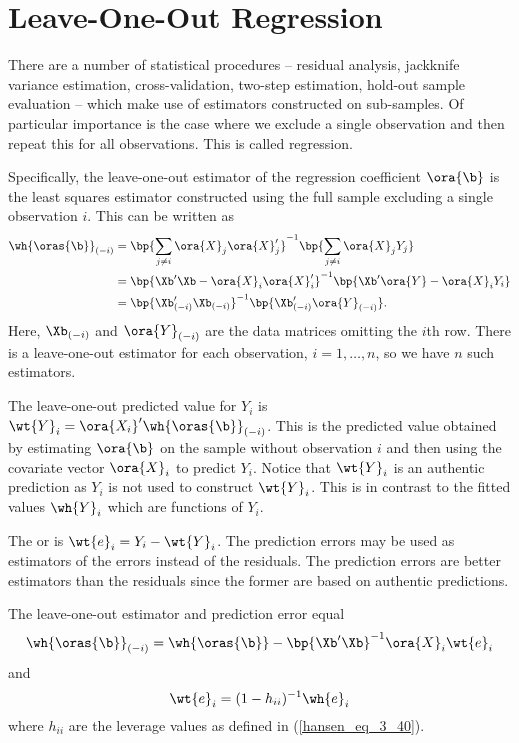 \section{Leave-One-Out Regression}
There are a number of statistical procedures -- residual analysis, jackknife variance estimation, cross-validation,
two-step estimation, hold-out sample evaluation -- which make use of estimators constructed on sub-samples. Of particular importance is the case where we exclude a single observation and then repeat this for all observations. This is called  regression.

Specifically, the leave-one-out estimator of the regression coefficient $\ora{\b}$ is the least squares estimator constructed using the full sample excluding a single observation $i$. This can be written as 
\begin{equation}
    \label{hansen_eq_3_42}
    \begin{aligned}
        \wh{\oras{\b}}_{(-i)} & = \bp{\sum_{j \neq i}\ora{X}_j \ora{X}_j^\prime}^{-1} \bp{\sum_{j \neq i}\ora{X}_j Y_j} \\
        & = \bp{\Xb^\prime \Xb- \ora{X}_i \ora{X}_i^\prime}^{-1} \bp{\Xb^\prime \ora{Y} - \ora{X}_i Y_i} \\
        & = \bp{\Xb^\prime_{(-i)} \Xb_{(-i)}}^{-1} \bp{\Xb^\prime_{(-i)} \ora{Y}_{(-i)}}.
    \end{aligned}
\end{equation}
Here, $\Xb_{(-i)}$ and $\ora{Y}_{(-i)}$ are the data matrices omitting the $i$th row. There is a leave-one-out estimator for each observation, $i = 1, \ldots, n$, so we have $n$ such estimators.

The leave-one-out predicted value for $Y_i$ is $\wt{Y}_i = \ora{X_i}^\prime \wh{\oras{\b}}_{(-i)}$. This is the predicted value obtained by estimating $\ora{\b}$ on the sample without observation $i$ and then using the covariate vector $\ora{X}_i$ to predict $Y_i$. Notice that $\wt{Y}_i$ is an authentic prediction as $Y_i$ is not used to construct $\wt{Y}_i$. This is in contrast to the fitted values $\wh{Y}_i$ which are functions of $Y_i$.

The  or  is $\wt{e}_i = Y_i  -\wt{Y}_i$. The prediction errors may be used as estimators of the errors instead of the residuals. The prediction errors are better estimators than the residuals since the former are based on authentic predictions.

\begin{theorem}
    \label{hansen_thm_3_7}
    The leave-one-out estimator and prediction error equal 
    \begin{equation}
        \label{hansen_eq_3_43}
        \wh{\oras{\b}}_{(-i)} = \wh{\oras{\b}} - \bp{\Xb^\prime \Xb}^{-1} \ora{X}_i \wt{e}_i
    \end{equation}
    and 
    \begin{equation}
        \label{hansen_eq_3_44}
        \wt{e}_i = (1 - h_{ii})^{-1} \wh{e}_i
    \end{equation}
    where $h_{ii}$ are the leverage values as defined in (\ref{hansen_eq_3_40}).
\end{theorem}

